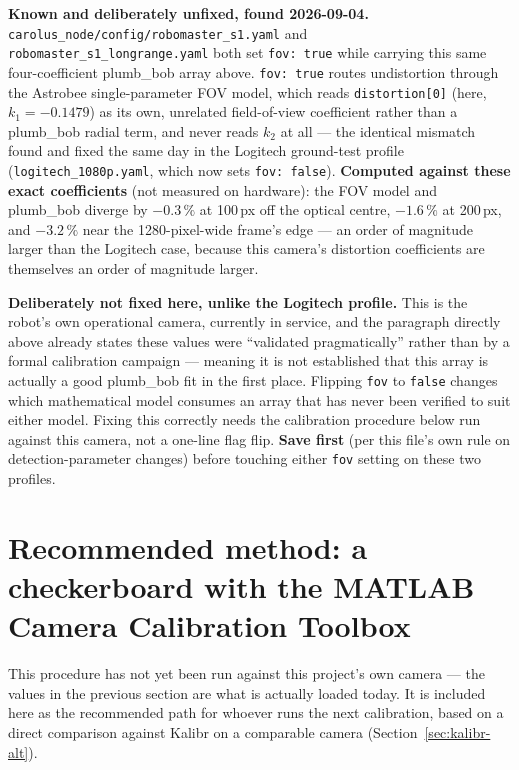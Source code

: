 \documentclass[11pt]{report}
\newenvironment{warningbox}%
  {\begin{lrbox}{\warnbox}\begin{minipage}{0.90\textwidth}}%
  {\end{minipage}\end{lrbox}%
   \begin{center}\fcolorbox{black}{codebg}{\usebox{\warnbox}}\end{center}}
\begin{document}
\begin{warningbox}
\textbf{Known and deliberately unfixed, found 2026-09-04.} \texttt{carolus\_node/config/robomaster\_s1.yaml}
and \texttt{robomaster\_s1\_longrange.yaml} both set \texttt{fov: true} while
carrying this same four-coefficient plumb\_bob array above. \texttt{fov:
true} routes undistortion through the Astrobee single-parameter FOV model,
which reads \texttt{distortion[0]} (here, $k_1=-0.1479$) as its own,
unrelated field-of-view coefficient rather than a plumb\_bob radial term,
and never reads $k_2$ at all --- the identical mismatch found and fixed the
same day in the Logitech ground-test profile
(\texttt{logitech\_1080p.yaml}, which now sets \texttt{fov: false}). \textbf{Computed against these exact coefficients} (not measured
on hardware): the FOV model and plumb\_bob diverge by
$-0.3\,\%$ at 100\,px off the optical centre, $-1.6\,\%$ at 200\,px, and
$-3.2\,\%$ near the 1280-pixel-wide frame's edge --- an order of magnitude
larger than the Logitech case, because this camera's distortion
coefficients are themselves an order of magnitude larger.

\textbf{Deliberately not fixed here, unlike the Logitech profile.} This is the robot's
own operational camera, currently in service, and the paragraph directly
above already states these values were ``validated pragmatically'' rather
than by a formal calibration campaign --- meaning it is not established that
this array is actually a good plumb\_bob fit in the first place. Flipping
\texttt{fov} to \texttt{false} changes which mathematical model consumes an
array that has never been verified to suit either model. Fixing this
correctly needs the calibration procedure below run against this camera,
not a one-line flag flip. \textbf{Save first} (per this file's own rule on
detection-parameter changes) before touching either \texttt{fov} setting on
these two profiles.
\end{warningbox}

\section{Recommended method: a checkerboard with the MATLAB Camera
Calibration Toolbox}

This procedure has not yet been run against this project's own camera ---
the values in the previous section are what is actually loaded today. It is
included here as the recommended path for whoever runs the next
calibration, based on a direct comparison against Kalibr on a comparable
camera (Section~\ref{sec:kalibr-alt}).
\end{document}
